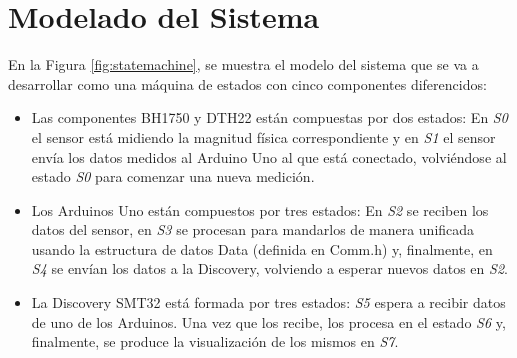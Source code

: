 \section{Modelado del Sistema}\label{sec:modelo}

En la Figura \ref{fig:statemachine}, se muestra el modelo del sistema que se va a
desarrollar como una m\'aquina de estados con cinco componentes
diferencidos:

\begin{itemize}
\item Las componentes BH1750 y DTH22 est\'an compuestas por dos
  estados: En \emph{S0} el sensor est\'a midiendo la magnitud f\'isica
  correspondiente y en \emph{S1} el sensor env\'ia los datos medidos
  al Arduino Uno al que est\'a conectado, volvi\'endose al estado
  \emph{S0} para comenzar una nueva medici\'on.
\item Los Arduinos Uno est\'an compuestos por tres estados: En
  \emph{S2} se reciben los datos del sensor, en \emph{S3} se procesan
  para mandarlos de manera unificada usando la estructura de datos
  Data (definida en Comm.h) y, finalmente, en \emph{S4} se env\'ian
  los datos a la Discovery, volviendo a esperar nuevos datos en
  \emph{S2}.
\item La Discovery SMT32 est\'a formada por tres estados: \emph{S5}
  espera a recibir datos de uno de los Arduinos. Una vez que los
  recibe, los procesa en el estado \emph{S6} y, finalmente, se produce
  la visualizaci\'on de los mismos en \emph{S7}. 
\end{itemize}

